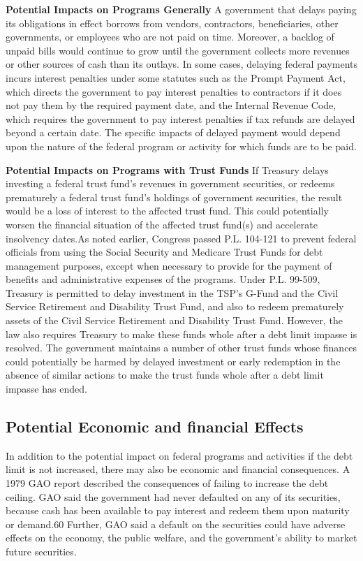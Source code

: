 \textbf{Potential Impacts on Programs Generally}
A government that delays paying its obligations in effect borrows from vendors, contractors, beneficiaries, other governments, or employees who are not paid on time. Moreover, a backlog of unpaid bills would continue to grow until the government collects more revenues or other sources of cash than its outlays. In some cases, delaying federal payments incurs interest penalties under some statutes such as the Prompt Payment Act, which directs the government to pay interest penalties to contractors if it does not pay them by the required payment date, and the Internal Revenue Code, which requires the government to pay interest penalties if tax refunds are delayed beyond a certain date. The specific impacts of delayed payment would depend upon the nature of the federal program or activity for which funds are to be paid.


\textbf{Potential Impacts on Programs with Trust Funds}
If Treasury delays investing a federal trust fund’s revenues in government securities, or redeems prematurely a federal trust fund’s holdings of government securities, the result would be a loss of interest to the affected trust fund. This could potentially worsen the financial situation of the affected trust fund(s) and accelerate insolvency dates.As noted earlier, Congress passed P.L. 104-121 to prevent federal officials from using the Social Security and Medicare Trust Funds for debt management purposes, except when necessary to provide for the payment of benefits and administrative expenses of the programs. Under P.L. 99-509, Treasury is permitted to delay investment in the TSP’s G-Fund and the Civil Service Retirement and Disability Trust Fund, and also to redeem prematurely assets of the Civil Service Retirement and Disability Trust Fund. However, the law also requires Treasury to make these funds whole after a debt limit impasse is resolved. The government maintains a number of other trust funds whose finances could potentially be harmed by delayed investment or early redemption in the absence of similar actions to make the trust funds whole after a debt limit impasse has ended.

\subsection{Potential Economic and financial Effects}
In addition to the potential impact on federal programs and activities if the debt limit is not increased, there may also be economic and financial consequences. A 1979 GAO report described the consequences of failing to increase the debt ceiling. GAO said the government had never defaulted on any of its securities, because cash has been available to pay interest and redeem them upon maturity or demand.60 Further, GAO said a default on the securities could have adverse effects on the economy, the public welfare, and the government’s ability to market future securities.

